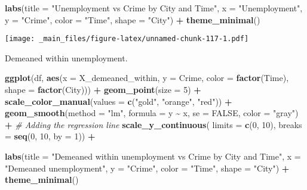 \documentclass[
]{book}
\newenvironment{Shaded}{\begin{snugshade}}{\end{snugshade}}
\newcommand{\AttributeTok}[1]{\textcolor[rgb]{0.13,0.29,0.53}{#1}}
\newcommand{\CommentTok}[1]{\textcolor[rgb]{0.56,0.35,0.01}{\textit{#1}}}
\newcommand{\ConstantTok}[1]{\textcolor[rgb]{0.56,0.35,0.01}{#1}}
\newcommand{\DecValTok}[1]{\textcolor[rgb]{0.00,0.00,0.81}{#1}}
\newcommand{\FunctionTok}[1]{\textcolor[rgb]{0.13,0.29,0.53}{\textbf{#1}}}
\newcommand{\NormalTok}[1]{#1}
\newcommand{\SpecialCharTok}[1]{\textcolor[rgb]{0.81,0.36,0.00}{\textbf{#1}}}
\newcommand{\StringTok}[1]{\textcolor[rgb]{0.31,0.60,0.02}{#1}}
\begin{document}
\begin{Shaded}
\begin{Highlighting}[]
  \FunctionTok{labs}\NormalTok{(}\AttributeTok{title =} \StringTok{"Unemployment vs Crime by City and Time"}\NormalTok{,}
       \AttributeTok{x =} \StringTok{"Unemployment"}\NormalTok{,}
       \AttributeTok{y =} \StringTok{"Crime"}\NormalTok{,}
       \AttributeTok{color =} \StringTok{"Time"}\NormalTok{,}
       \AttributeTok{shape =} \StringTok{"City"}\NormalTok{) }\SpecialCharTok{+}
  \FunctionTok{theme\_minimal}\NormalTok{()}
\end{Highlighting}
\end{Shaded}

\texttt{[image: \_main\_files/figure-latex/unnamed-chunk-117-1.pdf]}

Demeaned within unemployment.

\begin{Shaded}
\begin{Highlighting}[]
\FunctionTok{ggplot}\NormalTok{(df, }\FunctionTok{aes}\NormalTok{(}\AttributeTok{x =}\NormalTok{ X\_demeaned\_within, }\AttributeTok{y =}\NormalTok{ Crime, }\AttributeTok{color =} \FunctionTok{factor}\NormalTok{(Time), }\AttributeTok{shape =} \FunctionTok{factor}\NormalTok{(City))) }\SpecialCharTok{+}
  \FunctionTok{geom\_point}\NormalTok{(}\AttributeTok{size =} \DecValTok{5}\NormalTok{) }\SpecialCharTok{+}
  \FunctionTok{scale\_color\_manual}\NormalTok{(}\AttributeTok{values =} \FunctionTok{c}\NormalTok{(}\StringTok{"gold"}\NormalTok{, }\StringTok{"orange"}\NormalTok{, }\StringTok{"red"}\NormalTok{)) }\SpecialCharTok{+}
  \FunctionTok{geom\_smooth}\NormalTok{(}\AttributeTok{method =} \StringTok{"lm"}\NormalTok{, }\AttributeTok{formula =}\NormalTok{ y }\SpecialCharTok{\textasciitilde{}}\NormalTok{ x, }\AttributeTok{se =} \ConstantTok{FALSE}\NormalTok{, }\AttributeTok{color =} \StringTok{"gray"}\NormalTok{) }\SpecialCharTok{+}  \CommentTok{\# Adding the regression line}
  \FunctionTok{scale\_y\_continuous}\NormalTok{(}
  \AttributeTok{limits =} \FunctionTok{c}\NormalTok{(}\DecValTok{0}\NormalTok{, }\DecValTok{10}\NormalTok{),}
  \AttributeTok{breaks =} \FunctionTok{seq}\NormalTok{(}\DecValTok{0}\NormalTok{, }\DecValTok{10}\NormalTok{, }\AttributeTok{by =} \DecValTok{1}\NormalTok{)) }\SpecialCharTok{+}
  
  \FunctionTok{labs}\NormalTok{(}\AttributeTok{title =} \StringTok{"Demeaned within unemployment vs Crime by City and Time"}\NormalTok{,}
       \AttributeTok{x =} \StringTok{"Demeaned unemployment"}\NormalTok{,}
       \AttributeTok{y =} \StringTok{"Crime"}\NormalTok{,}
       \AttributeTok{color =} \StringTok{"Time"}\NormalTok{,}
       \AttributeTok{shape =} \StringTok{"City"}\NormalTok{) }\SpecialCharTok{+}
  \FunctionTok{theme\_minimal}\NormalTok{()}
\end{Highlighting}
\end{Shaded}
\end{document}
